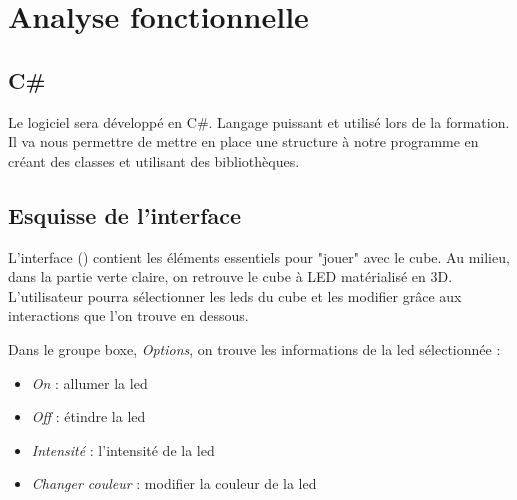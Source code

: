 \documentclass[a4paper,12pt]{article}
\begin{document}
\newpage
\section{Analyse fonctionnelle}

\subsection{C\#}
Le logiciel sera développé en C\#. Langage puissant et utilisé lors de la formation. Il va nous permettre de mettre en place une structure à notre programme en créant des classes et utilisant des bibliothèques. 

\subsection{Esquisse de l'interface}

L'interface () contient les éléments essentiels pour "jouer" avec le cube. Au milieu, dans la partie verte claire, on retrouve le cube à LED matérialisé en 3D. L'utilisateur pourra sélectionner les leds du cube et les modifier grâce aux interactions que l'on trouve en dessous.
\vspace{.5cm}

\noindent Dans le groupe boxe, \emph{Options}, on trouve les informations de la led sélectionnée :
\begin{itemize}
	\item \emph{On} : allumer la led
	\item \emph{Off} : étindre la led
	\item \emph{Intensité} : l'intensité de la led
	\item \emph{Changer couleur} : modifier la couleur de la led
\end{itemize}
\vspace{.5cm}
\end{document}
